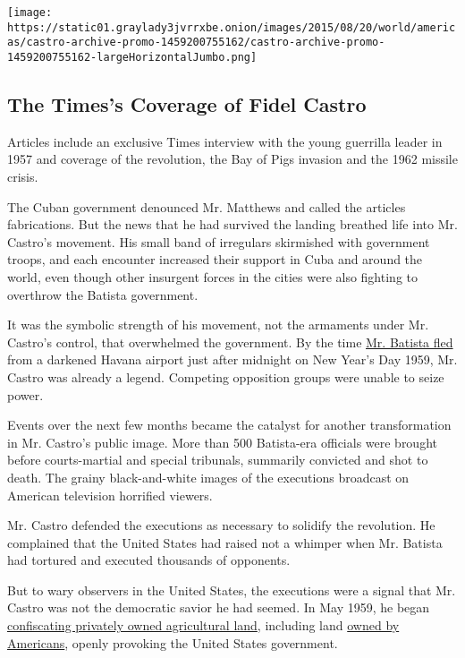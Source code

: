 \href{https://www.nytimes3xbfgragh.onion/interactive/2016/11/26/world/americas/castro-archive-promo.html}{}

\texttt{[image: https://static01.graylady3jvrrxbe.onion/images/2015/08/20/world/americas/castro-archive-promo-1459200755162/castro-archive-promo-1459200755162-largeHorizontalJumbo.png]}

\hypertarget{the-timess-coverage-of-fidel-castro}{%
\subsection{The Times's Coverage of Fidel
Castro}\label{the-timess-coverage-of-fidel-castro}}

Articles include an exclusive Times interview with the young guerrilla
leader in 1957 and coverage of the revolution, the Bay of Pigs invasion
and the 1962 missile crisis.

The Cuban government denounced Mr. Matthews and called the articles
fabrications. But the news that he had survived the landing breathed
life into Mr. Castro's movement. His small band of irregulars skirmished
with government troops, and each encounter increased their support in
Cuba and around the world, even though other insurgent forces in the
cities were also fighting to overthrow the Batista government.

It was the symbolic strength of his movement, not the armaments under
Mr. Castro's control, that overwhelmed the government. By the time
\href{http://timesmachine.nytimes3xbfgragh.onion/timesmachine/1959/01/02/83432639.html?action=click\&contentCollection=Archives\&module=LedeAsset\&region=ArchiveBody\&pgtype=article\&pageNumber=1\&rpm=true}{Mr.
Batista fled} from a darkened Havana airport just after midnight on New
Year's Day 1959, Mr. Castro was already a legend. Competing opposition
groups were unable to seize power.

Events over the next few months became the catalyst for another
transformation in Mr. Castro's public image. More than 500 Batista-era
officials were brought before courts-martial and special tribunals,
summarily convicted and shot to death. The grainy black-and-white images
of the executions broadcast on American television horrified viewers.

Mr. Castro defended the executions as necessary to solidify the
revolution. He complained that the United States had raised not a
whimper when Mr. Batista had tortured and executed thousands of
opponents.

But to wary observers in the United States, the executions were a signal
that Mr. Castro was not the democratic savior he had seemed. In May
1959, he began
\href{http://timesmachine.nytimes3xbfgragh.onion/timesmachine/1959/05/14/80577418.html?action=click\&contentCollection=Archives\&module=ArticleEndCTA\&region=ArchiveBody\&pgtype=article\&pageNumber=10\&rpm=true}{confiscating
privately owned agricultural land}, including land
\href{http://query.nytimes3xbfgragh.onion/gst/abstract.html?res=9F02E5DB1F3CE63BBC4052DFB1668382649EDE}{owned
by Americans}, openly provoking the United States government.

